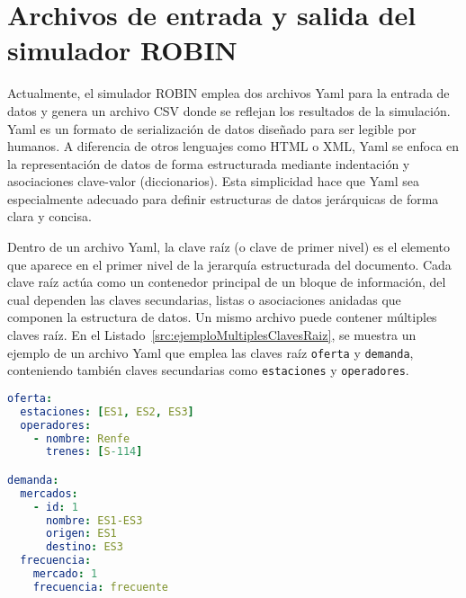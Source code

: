 \section{Archivos de entrada y salida del simulador ROBIN}
\label{sec:archivosEntradaSalida}

Actualmente, el simulador \acrshort{ROBIN} emplea dos archivos \acrshort{Yaml} para la entrada de datos y genera un archivo \acrshort{CSV} donde se reflejan los resultados de la simulación. \acrshort{Yaml} es un formato de serialización de datos diseñado para ser legible por humanos. A diferencia de otros lenguajes como \acrfull{HTML} o \acrfull{XML}, \acrshort{Yaml} se enfoca en la representación de datos de forma estructurada mediante indentación y asociaciones clave-valor (diccionarios). Esta simplicidad hace que \acrshort{Yaml} sea especialmente adecuado para definir estructuras de datos jerárquicas de forma clara y concisa.


Dentro de un archivo \acrshort{Yaml}, la clave raíz (o clave de primer nivel) es el elemento que aparece en el primer nivel de la jerarquía estructurada del documento. Cada clave raíz actúa como un contenedor principal de un bloque de información, del cual dependen las claves secundarias, listas o asociaciones anidadas que componen la estructura de datos. Un mismo archivo puede contener múltiples claves raíz. En el Listado~\ref{src:ejemploMultiplesClavesRaiz}, se muestra un ejemplo de un archivo \acrshort{Yaml} que emplea las claves raíz \texttt{oferta} y \texttt{demanda}, conteniendo también claves secundarias como \texttt{estaciones} y \texttt{operadores}.

\begin{lstlisting}[language=YAML,
                   frame=none,
                   numbers=none,
                   basicstyle=\ttfamily\normalsize,
                   caption={Ejemplo de archivo Yaml con múltiples claves raíz},
                   label=src:ejemploMultiplesClavesRaiz,
                   inputencoding=utf8]                   
oferta:
  estaciones: [ES1, ES2, ES3]
  operadores:
    - nombre: Renfe
      trenes: [S-114]

demanda:
  mercados:
    - id: 1
      nombre: ES1-ES3
      origen: ES1
      destino: ES3
  frecuencia:
    mercado: 1
    frecuencia: frecuente
    
\end{lstlisting}

